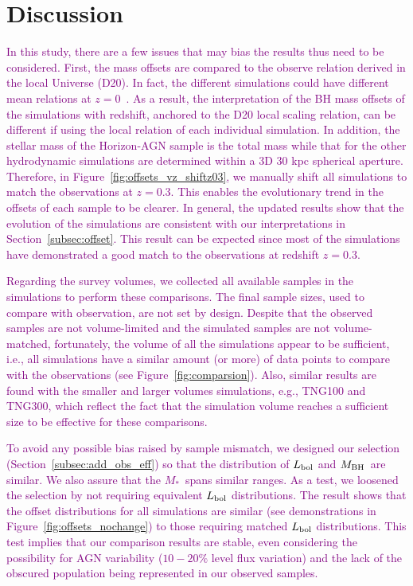 \documentclass[twocolumn]{aastex631}
\newcommand{\todo}[1]{\textcolor{red}{[{\bf TODO}: #1]}}
\newcommand{\red}[1]{\textcolor{purple}{#1}}
\def\smass{{$M_*$}}
\def\mbh{$M_{\rm BH}$}
\begin{document}
\section{Discussion} \label{sec:dis}
\red{In this study, there are a few issues that may bias the results thus need to be considered. First, the mass offsets are compared to the observe relation derived in the local Universe (D20). In fact, the different simulations could have different mean relations at $z=0$~\citep[e.g.,][]{Habouzit2021}. As a result, the interpretation of the BH mass offsets of the simulations with redshift, anchored to the D20 local scaling relation, can be different if using the local relation of each individual simulation. In addition, the stellar mass of the Horizon-AGN sample is the total mass while that for the other hydrodynamic simulations are determined within a 3D 30 kpc spherical aperture. Therefore, in Figure~\ref{fig:offsets_vz_shiftz03}, we manually shift all simulations to match the observations at $z=0.3$. This enables the evolutionary trend in the offsets of each sample to be clearer. In general, the updated results show that the evolution of the simulations are consistent with our interpretations in Section~\ref{subsec:offset}. This result can be expected since most of the simulations have demonstrated a good match to the observations at redshift $z=0.3$.}

\red{Regarding the survey volumes, we collected all available samples in the simulations to perform these comparisons. The final sample sizes, used to compare with observation, are not set by design. Despite that the observed samples are not volume-limited and the simulated samples are not volume-matched, fortunately, the volume of all the simulations appear to be sufficient, i.e., all simulations have a similar amount (or more) of data points to compare with the observations (see Figure~\ref{fig:comparsion}). Also, similar results are found with the smaller and larger volumes simulations, e.g., TNG100 and TNG300, which reflect the fact that the simulation volume reaches a sufficient size to be effective for these comparisons.}

\red{To avoid any possible bias raised by sample mismatch, we designed our selection (Section~\ref{subsec:add_obs_eff}) so that the distribution of $L_{\rm bol}$ and \mbh\ are similar. We also assure that the \smass\ spans similar ranges. As a test, we loosened the selection by not requiring equivalent $L_{\rm bol}$ distributions. The result shows that the offset distributions for all simulations are similar (see demonstrations in Figure~\ref{fig:offsets_nochange}) to those requiring matched $L_{\rm bol}$ distributions. This test implies that our comparison results are stable, even considering the possibility for AGN variability ($10-20\%$ level flux variation) and the lack of the obscured population being represented in our observed samples.
}
\end{document}
